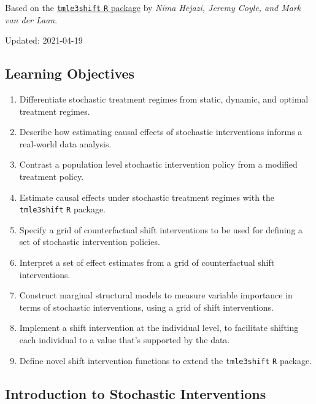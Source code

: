\documentclass[12pt, krantz2,]{krantz}
\providecommand{\tightlist}{%
  \setlength{\itemsep}{0pt}\setlength{\parskip}{0pt}}
\theoremstyle{definition}
\theoremstyle{definition}
\theoremstyle{definition}
\newcommand{\1}{\mathbbm{1}}
\begin{document}
Based on the \href{https://github.com/tlverse/tmle3shift}{\texttt{tmle3shift} \texttt{R} package}
by \emph{Nima Hejazi, Jeremy Coyle, and Mark van der Laan}.

Updated: 2021-04-19

\hypertarget{learning-objectives-5}{%
\subsection{Learning Objectives}\label{learning-objectives-5}}

\begin{enumerate}
\def\labelenumi{\arabic{enumi}.}
\tightlist
\item
  Differentiate stochastic treatment regimes from static, dynamic, and optimal
  treatment regimes.
\item
  Describe how estimating causal effects of stochastic interventions informs a
  real-world data analysis.
\item
  Contrast a population level stochastic intervention policy from a modified
  treatment policy.
\item
  Estimate causal effects under stochastic treatment regimes with the
  \texttt{tmle3shift} \texttt{R} package.
\item
  Specify a grid of counterfactual shift interventions to be used for defining
  a set of stochastic intervention policies.
\item
  Interpret a set of effect estimates from a grid of counterfactual shift
  interventions.
\item
  Construct marginal structural models to measure variable importance in terms
  of stochastic interventions, using a grid of shift interventions.
\item
  Implement a shift intervention at the individual level, to facilitate
  shifting each individual to a value that's supported by the data.
\item
  Define novel shift intervention functions to extend the \texttt{tmle3shift} \texttt{R}
  package.
\end{enumerate}

\hypertarget{introduction-to-stochastic-interventions}{%
\subsection{Introduction to Stochastic Interventions}\label{introduction-to-stochastic-interventions}}
\end{document}
